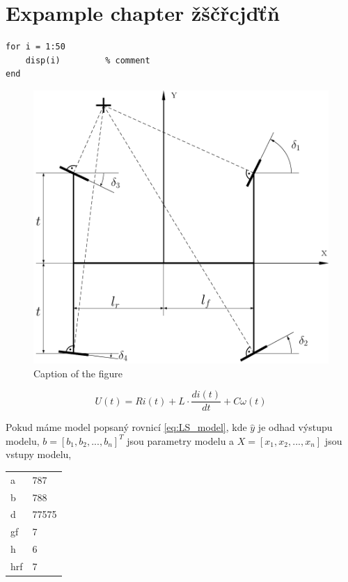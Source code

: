 \chapter{Expample chapter žščřcjďťň}
\label{chap:Expample}

\lipsum[1]

\begin{lstlisting}
for i = 1:50
	disp(i)			% comment         
end
\end{lstlisting}

\begin{figure}[!h] 
	\begin{center}
		\includegraphics[scale=0.4]{images/example_fig.pdf}
	\end{center}
	\caption[Caption in list of figures]{Caption of the figure}
	\label{fig:figurelabel}
\end{figure}	

\lipsum[2]

\begin{equation}\label{eq:DCmot}
U(t) = Ri(t) + L\cdot\frac{di(t)}{dt} + C\omega(t)
\end{equation}

Pokud máme model popsaný rovnicí \ref{eq:LS_model}, kde \boldmath $\hat{y}$ je odhad výstupu modelu, $b = \left[b_1,b_2,...,b_n\right]^T$ jsou parametry modelu a $X = \left[x_1,x_2,...,x_n\right]$ jsou vstupy modelu, \unboldmath

\begin{center}
	\begin{tabular}{|l|l|}
		&  \\ 
		\hline 
		a & 787 \\ 
		b & 788 \\ 
		d & 77575 \\ 
		gf & 7 \\ 
		h & 6 \\ 
		hrf & 7 \\ 
	\end{tabular} 
\end{center}


